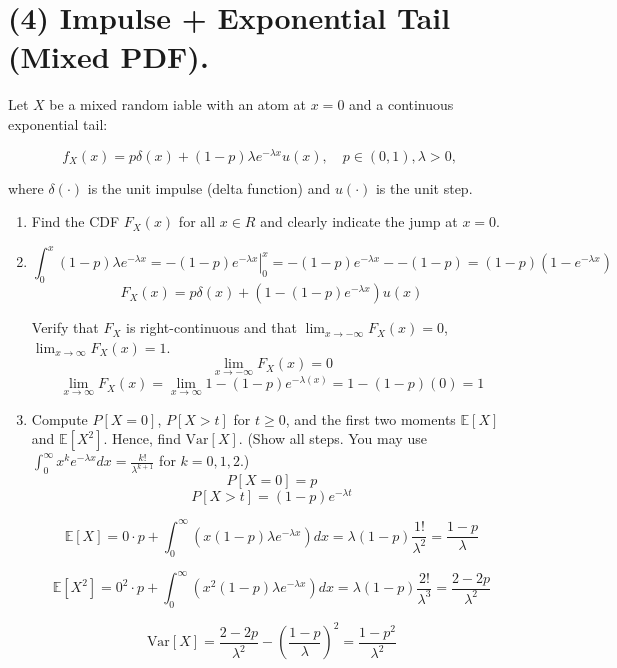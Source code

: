 \documentclass[12pt]{article}
\newenvironment{bluetext}{\color{blue}}{}
\begin{document}
\vspace{1cm}

\section*{(4) Impulse + Exponential Tail (Mixed PDF).}

Let $X$ be a mixed random iable with an atom at $x = 0$ and a continuous exponential
tail:

\[
f_X(x) = p\delta(x) + (1-p)\lambda e^{-\lambda x}u(x), \quad p \in (0, 1), \lambda > 0,
\]

where $\delta(\cdot)$ is the unit impulse (delta function) and $u(\cdot)$ is the unit step.

\begin{enumerate}
    \item[(a)] Find the CDF $F_X(x)$ for all $x \in R$ and clearly indicate the jump at $x = 0$.
    \item[] \begin{bluetext}
    \[\int_{0}^{x}{(1-p)\lambda e^{-\lambda x}}=\left.-(1-p)e^{-\lambda x}\right\rvert_0^{x}= -(1-p)e^{-\lambda x} - -(1-p) = (1-p)(1-e^{-\lambda x})\]
        \[F_X(x) = p\delta(x)+\left(1-(1-p)e^{-\lambda x}\right)u(x)\]
    \end{bluetext}
    
    Verify that $F_X$ is right-continuous and that $\lim_{x\to-\infty} F_X(x) = 0$, $\lim_{x\to\infty} F_X(x) = 1$.
    \begin{bluetext}
    \[\lim_{x\to-\infty} F_X(x) = 0\]
    \[\lim_{x\to\infty} F_X(x) = \lim_{x\to\infty}1-(1-p)e^{-\lambda (x)}= 1-(1-p)(0)=1\]
    \end{bluetext}
    \item[(b)] Compute $P[X = 0]$, $P[X > t]$ for $t \geq 0$, and the first two moments $\mathbb{E}[X]$
    and $\mathbb{E}[X^2]$. Hence, find $\text{Var}[X]$. (Show all steps. You may use $\int_0^\infty x^k e^{-\lambda x} dx = \frac{k!}{\lambda^{k+1}}$ for $k = 0, 1, 2$.)
    \begin{bluetext}
        \[P[X=0]=p\]
        \[P[X>t]=(1-p)e^{-\lambda t}\]

        \[\mathbb{E}[X]=0\cdot p +\int_{0}^{\infty}\left(x(1-p)\lambda e^{-\lambda x}\right)dx=\lambda(1-p)\frac{1!}{\lambda^2}= \frac{1-p}{\lambda}\]

        \[\mathbb{E}[X^2]=0^2\cdot p +\int_{0}^{\infty}\left(x^2(1-p)\lambda e^{-\lambda x}\right)dx=\lambda(1-p)\frac{2!}{\lambda^3}= \frac{2-2p}{\lambda^2}\]

        \[\text{Var}[X]=\frac{2-2p}{\lambda^2}-\left(\frac{1-p}{\lambda}\right)^2=\frac{1-p^2}{\lambda^2}\]
    \end{bluetext}
\end{enumerate}
\end{document}
